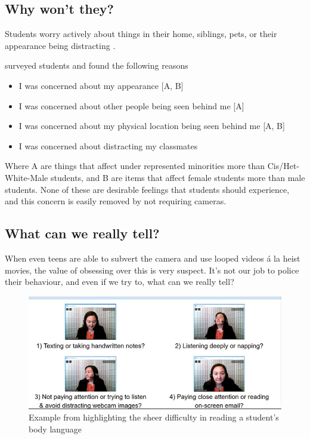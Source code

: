 \documentclass[paper=a4,justified,a4paper]{tufte-handout}
\providecommand{\tightlist}{%
  \setlength{\itemsep}{0pt}\setlength{\parskip}{0pt}}
\begin{document}
\hypertarget{why-wont-they}{%
\subsection{Why won't they?}\label{why-wont-they}}

Students worry actively about things in their home, siblings, pets, or
their appearance being distracting .

\citep{10.1002/ece3.7123} surveyed students and found the following
reasons

\begin{itemize}
\tightlist
\item
  I was concerned about my appearance {[}A, B{]}
\item
  I was concerned about other people being seen behind me {[}A{]}
\item
  I was concerned about my physical location being seen behind me {[}A,
  B{]}
\item
  I was concerned about distracting my classmates
\end{itemize}

Where A are things that affect under represented minorities more than
Cis/Het-White-Male students, and B are items that affect female students
more than male students. None of these are desirable feelings that
students should experience, and this concern is easily removed by not
requiring cameras.

\hypertarget{what-can-we-really-tell}{%
\subsection{What can we really tell?}\label{what-can-we-really-tell}}

When even teens are able to subvert the camera \citep{vice} and use
looped videos á la heist movies, the value of obsessing over this is
very suspect. It's not our job to police their behaviour, and even if we
try to, what can we really tell?

\begin{figure}
\centering
\includegraphics{educase.jpg}
\caption{Example from \citep{educase} highlighting the sheer difficulty
in reading a student's body language}
\end{figure}
\end{document}
